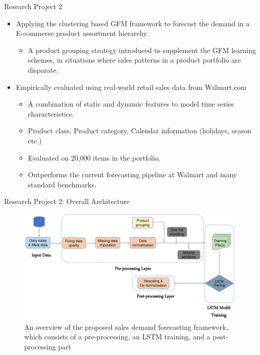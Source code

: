 \documentclass{beamer}
\begin{document}
\begin{frame}{Research Project 2}
	\begin{itemize}
	\item Applying the clustering based GFM framework to forecast the demand in a E-commerce product assortment hierarchy
	\begin{itemize}\color{blue}
		\item A product grouping strategy introduced to supplement the GFM learning schemes, in situations where sales patterns in a product portfolio are disparate.
	\end{itemize}
	\vspace{0.8mm}
	\item Empirically evaluated using real-world retail sales data from Walmart.com
	\begin{itemize}\color{blue}
		\item A combination of static and dynamic features to model time series characteristics.
		\item Product class, Product category, Calendar information (holidays, season etc.)
		\item Evaluated on 20,000 items in the portfolio. 
		\item Outperforms the current forecasting pipeline at Walmart and many standard benchmarks.
	\end{itemize}
	\end{itemize}
\end{frame}

\begin{frame}{Research Project 2: Overall Architecture}
\begin{figure}[htbp]

\centerline{\includegraphics[width=1.10\textwidth]{images/system_diagram}}

\caption{ \scriptsize An overview of the proposed sales demand forecasting framework, which consists of a pre-processing, an LSTM training, and a post-processing part}

\label{process}

\end{figure}
\end{frame}
\end{document}
